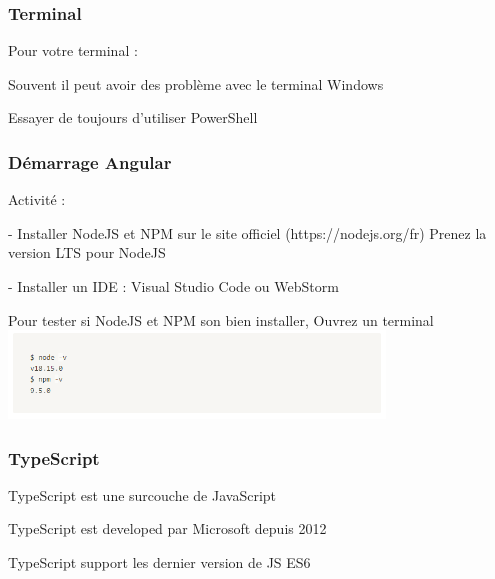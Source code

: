 \documentclass[10pt]{beamer}
\begin{document}
	\begin{frame}
		\frametitle{Terminal}

		Pour votre terminal : \newline \newline

		Souvent il peut avoir des problème avec le terminal Windows \newline \newline

		Essayer de toujours d'utiliser PowerShell \newline \newline

	\end{frame}

	\begin{frame}
		\frametitle{Démarrage Angular}

		Activité :  \newline \newline

		- Installer NodeJS et NPM sur le site officiel (https://nodejs.org/fr)
		Prenez la version LTS pour NodeJS  \newline \newline

		- Installer un IDE : Visual Studio Code ou WebStorm  \newline \newline

		Pour tester si NodeJS et NPM son bien installer, Ouvrez un terminal  \newline
		\includegraphics[width=10cm]{assets/npminstall}\newline

	\end{frame}


	\begin{frame}
		\frametitle{TypeScript}

		TypeScript est une surcouche de JavaScript  \newline \newline

		TypeScript est developed par Microsoft depuis 2012  \newline \newline

		TypeScript support les dernier version de JS ES6

	\end{frame}
\end{document}
